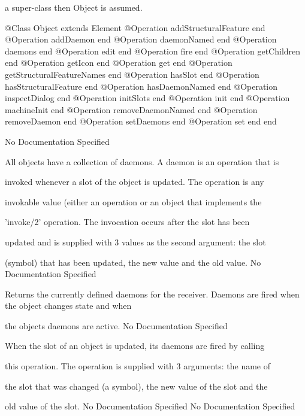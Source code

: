       a super-class then Object is assumed.
\begin{Interface}
@Class Object extends Element
  @Operation addStructuralFeature end
  @Operation addDaemon end
  @Operation daemonNamed end
  @Operation daemons end
  @Operation edit end
  @Operation fire end
  @Operation getChildren end
  @Operation getIcon end
  @Operation get end
  @Operation getStructuralFeatureNames end
  @Operation hasSlot end
  @Operation hasStructuralFeature end
  @Operation hasDaemonNamed end
  @Operation inspectDialog end
  @Operation initSlots end
  @Operation init end
  @Operation machineInit end
  @Operation removeDaemonNamed end
  @Operation removeDaemon end
  @Operation setDaemons end
  @Operation set end
end
\end{Interface}
No Documentation Specified

      All objects have a collection of daemons. A daemon is an operation that is

      invoked whenever a slot of the object is updated. The operation is any

      invokable value (either an operation or an object that implements the

      'invoke/2' operation. The invocation occurs after the slot has been

      updated and is supplied with 3 values as the second argument: the slot

      (symbol) that has been updated, the new value and the old value.
No Documentation Specified

      Returns the currently defined daemons for the receiver.
      Daemons are fired when the object changes state and when

      the objects daemons are active.
No Documentation Specified

      When the slot of an object is updated, its daemons are fired by calling

      this operation. The operation is supplied with 3 arguments: the name of

      the slot that was changed (a symbol), the new value of the slot and the

      old value of the slot.
No Documentation Specified
No Documentation Specified

